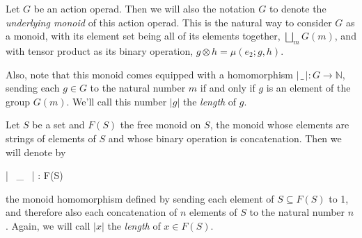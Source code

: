 \begin{defn} Let $G$ be an action operad. Then we will also the notation $G$ to denote the \emph{underlying monoid} of this action operad. This is the natural way to consider $G$ as a monoid, with its element set being all of its elements together, $\bigsqcup_m G(m)$, and with tensor product as its binary operation, $g \otimes h = \mu(e_2; g, h)$.

Also, note that this monoid comes equipped with a homomorphism $| \, \_ \, | : G \to \mathbb{N}$, sending each $g \in G$ to the natural number $m$ if and only if $g$ is an element of the group $G(m)$. We'll call this number $|g|$ the \emph{length} of $g$.
\end{defn}

\begin{defn}\label{lengthdef} Let $S$ be a set and $F(S)$ the free monoid on $S$, the monoid whose elements are strings of elements of $S$ and whose binary operation is concatenation. Then we will denote by
\begin{eq*} | \, \_ \, | : F(S) \to {} \end{eq*}
the monoid homomorphism defined by sending each element of $S \subseteq F(S)$ to 1, and therefore also each concatenation of $n$ elements of $S$ to the natural number $n$. Again, we will call $|x|$ the \emph{length} of $x \in F(S)$.
\end{defn}

